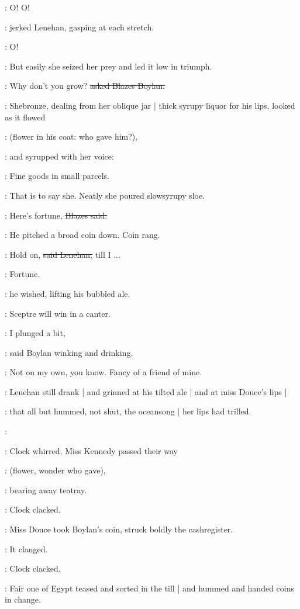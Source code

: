 \lenehan:
O!
O!

:
jerked Lenehan,
gasping at each stretch.

\lenehan:
O!

:
But easily she seized her prey and led it low in triumph.

\boylan:
Why don't you grow?
\sout{asked Blazes Boylan.}

:
Shebronze,
dealing from her oblique jar |
thick syrupy liquor for his lips,
looked as it flowed

\BloomInt:
(flower in his coat:
who gave him?),

:
and syrupped with her voice:

\MissD:
Fine goods in small parcels.

:
That is to say she.
Neatly she poured slowsyrupy sloe.

\boylan:
Here's fortune,
\sout{Blazes said.}

:
He pitched a broad coin down.
Coin rang.

\lenehan:
Hold on,
\sout{said Lenehan,}
till I ...

\lenehan:
Fortune.

:
he wished,
lifting his bubbled ale.

\lenehan:
Sceptre will win in a canter.

\boylan:
I plunged a bit,

:
said Boylan winking and drinking.

\boylan:
Not on my own,
you know.
Fancy of a friend of mine.

:
Lenehan still drank |
and grinned at his tilted ale |
and at miss Douce's lips |

:
that all but hummed,
not shut,
the oceansong |
her lips had trilled.

\MissD:

:
Clock whirred.
Miss Kennedy passed their way

\BloomInt:
(flower,
wonder who gave),

:
bearing away teatray.

:
Clock clacked.

:
Miss Douce took Boylan's coin,
struck boldly the cashregister.

:
It clanged.

:
Clock clacked.

:
Fair one of Egypt teased and sorted in the till |
and hummed and handed coins in change.

